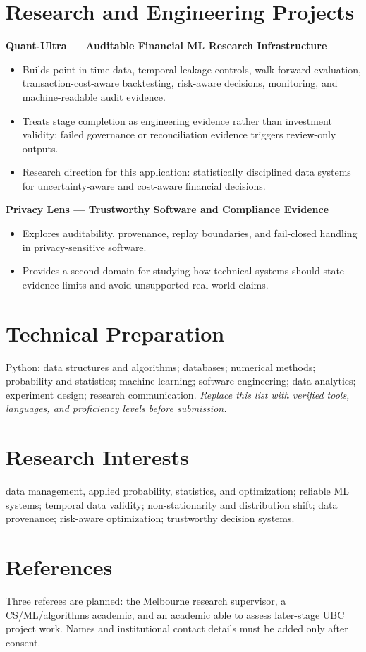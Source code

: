 \documentclass[11pt]{article}
\begin{document}
\section*{Research and Engineering Projects}
\textbf{Quant-Ultra --- Auditable Financial ML Research Infrastructure}
\begin{itemize}
\item Builds point-in-time data, temporal-leakage controls, walk-forward evaluation, transaction-cost-aware backtesting, risk-aware decisions, monitoring, and machine-readable audit evidence.
\item Treats stage completion as engineering evidence rather than investment validity; failed governance or reconciliation evidence triggers review-only outputs.
\item Research direction for this application: statistically disciplined data systems for uncertainty-aware and cost-aware financial decisions.
\end{itemize}

\begin{samepage}
\textbf{Privacy Lens --- Trustworthy Software and Compliance Evidence}
\begin{itemize}
\item Explores auditability, provenance, replay boundaries, and fail-closed handling in privacy-sensitive software.
\item Provides a second domain for studying how technical systems should state evidence limits and avoid unsupported real-world claims.
\end{itemize}
\end{samepage}

\section*{Technical Preparation}
Python; data structures and algorithms; databases; numerical methods; probability and statistics; machine learning; software engineering; data analytics; experiment design; research communication. \textit{Replace this list with verified tools, languages, and proficiency levels before submission.}

\section*{Research Interests}
data management, applied probability, statistics, and optimization; reliable ML systems; temporal data validity; non-stationarity and distribution shift; data provenance; risk-aware optimization; trustworthy decision systems.

\section*{References}
Three referees are planned: the Melbourne research supervisor, a CS/ML/algorithms academic, and an academic able to assess later-stage UBC project work. Names and institutional contact details must be added only after consent.
\end{document}
